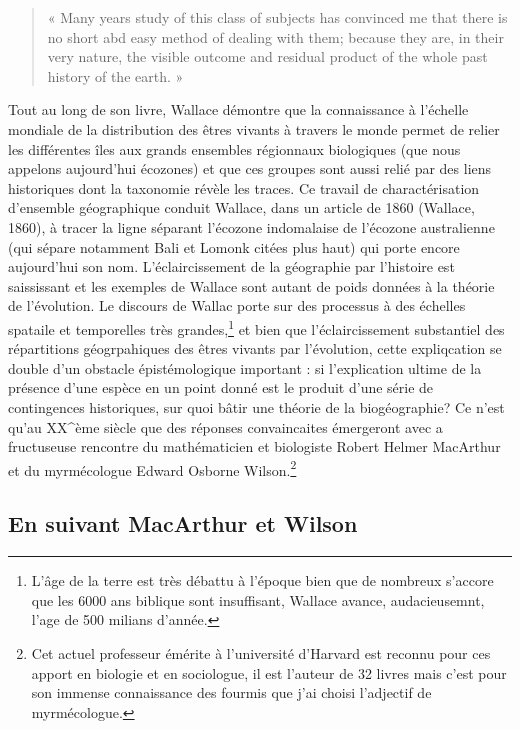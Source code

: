\begin{quote}
« Many years study of this class of subjects has convinced me that there
is no short abd easy method of dealing with them; because they are, in
their very nature, the visible outcome and residual product of the whole
past history of the earth. »
\end{quote}

Tout au long de son livre, Wallace démontre que la connaissance à
l'échelle mondiale de la distribution des êtres vivants à travers le
monde permet de relier les différentes îles aux grands ensembles
régionnaux biologiques (que nous appelons aujourd'hui écozones) et que
ces groupes sont aussi relié par des liens historiques dont la taxonomie
révèle les traces. Ce travail de charactérisation d'ensemble
géographique conduit Wallace, dans un article de 1860 (Wallace, 1860), à
tracer la ligne séparant l'écozone indomalaise de l'écozone australienne
(qui sépare notamment Bali et Lomonk citées plus haut) qui porte encore
aujourd'hui son nom. L'éclaircissement de la géographie par l'histoire
est saississant et les exemples de Wallace sont autant de poids données
à la théorie de l'évolution. Le discours de Wallac porte sur des
processus à des échelles spataile et temporelles très grandes,\footnote{L'âge
  de la terre est très débattu à l'époque bien que de nombreux s'accore
  que les 6000 ans biblique sont insuffisant, Wallace avance,
  audacieusemnt, l'age de 500 milians d'année.} et bien que
l'éclaircissement substantiel des répartitions géogrpahiques des êtres
vivants par l'évolution, cette expliqcation se double d'un obstacle
épistémologique important : si l'explication ultime de la présence d'une
espèce en un point donné est le produit d'une série de contingences
historiques, sur quoi bâtir une théorie de la biogéographie? Ce n'est
qu'au XX\^{}ème siècle que des réponses convaincaites émergeront avec a
fructuseuse rencontre du mathématicien et biologiste Robert Helmer
MacArthur et du myrmécologue Edward Osborne Wilson.\footnote{Cet actuel
  professeur émérite à l'université d'Harvard est reconnu pour ces
  apport en biologie et en sociologue, il est l'auteur de 32 livres mais
  c'est pour son immense connaissance des fourmis que j'ai choisi
  l'adjectif de myrmécologue.}

\subsection{En suivant MacArthur et
Wilson}\label{en-suivant-macarthur-et-wilson}

